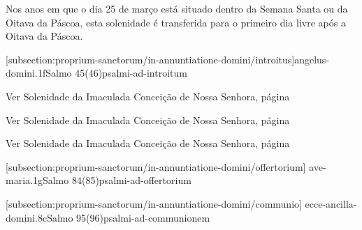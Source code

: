 \def\Prefix{subsection:proprium-sanctorum/in-annuntiatione-domini}

\begin{rubrica}
  Nos anos em que o dia 25 de março está situado dentro da Semana Santa ou da Oitava da Páscoa, esta solenidade é transferida para o primeiro dia livre após a Oitava da Páscoa.
\end{rubrica}

[\Prefix/introitus]{angelus-domini.1f}{Salmo 45(46)}{psalmi-ad-introitum}

\begin{rubrica}
  Ver Solenidade da Imaculada Conceição de Nossa Senhora, página~\pageref{subsection:proprium-sanctorum/in-conceptione-immaculata-bmv/psalmus-responsorius}
\end{rubrica}

\begin{rubrica}
  Ver Solenidade da Imaculada Conceição de Nossa Senhora, página~\pageref{subsection:proprium-sanctorum/in-conceptione-immaculata-bmv/alleluia}
\end{rubrica}

\begin{rubrica}
  Ver Solenidade da Imaculada Conceição de Nossa Senhora, página~\pageref{subsection:proprium-sanctorum/in-conceptione-immaculata-bmv/psalmus-alleluiaticus}
\end{rubrica}

\AllowPageFlush

[\Prefix/offertorium]
{ave-maria.1g}{Salmo 84(85)}{psalmi-ad-offertorium}

\AllowPageBreak

[\Prefix/communio]
{ecce-ancilla-domini.8c}{Salmo 95(96)}{psalmi-ad-communionem}

\AllowPageFlush
